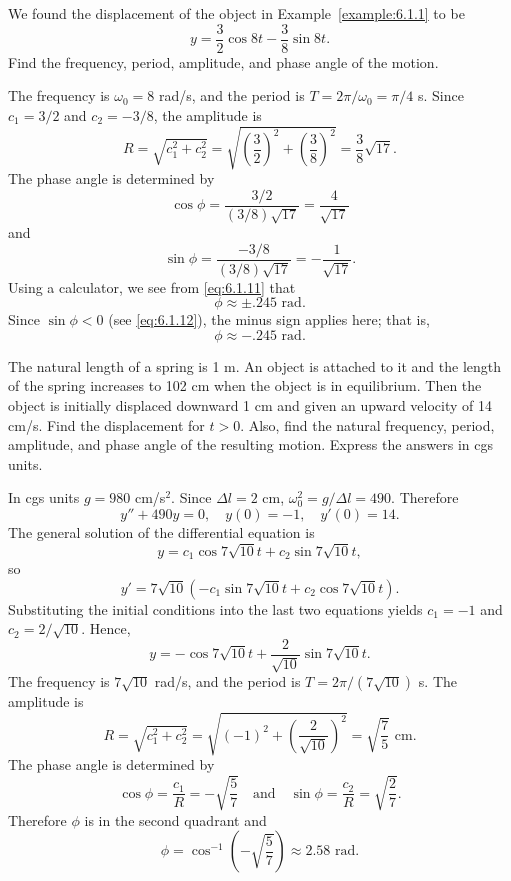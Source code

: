 \documentclass{ximera}
\begin{document}
\begin{example}\label{example:6.1.2}
We found the displacement of the object
 in Example~\ref{example:6.1.1} to be
$$
y=\frac{3}{2}\cos8t-\frac{3}{8}\sin8t.
$$
Find the frequency, period, amplitude, and phase angle of the motion.
 
\begin{explanation}
The frequency is $\omega_0=8$ rad/s, and the period is
$T=2\pi/\omega_0=\pi/4$ s. Since $c_1=3/2$ and $c_2=-3/8$,
the amplitude is
$$
R=\sqrt{c^2_1+c^2_2}=\sqrt{\left(\frac{3}{2}\right)^2+\left(\frac{3}{8}\right)^2}
=\frac{3}{8}\sqrt{17}.
$$
The phase angle is determined by
\begin{equation}\label{eq:6.1.11}
\cos\phi=\frac{3/2}{(3/8)\sqrt{17}}=\frac{4}{\sqrt{17}}
\end{equation}
and
\begin{equation}\label{eq:6.1.12}
\sin\phi=\frac{-3/8}{(3/8)\sqrt{17}}=-\frac{1}{\sqrt{17}}.
\end{equation}
 Using a calculator, we see from \eqref{eq:6.1.11} that
$$
\phi\approx\pm.245\mbox{ rad}.
$$
Since $\sin\phi<0$ (see \eqref{eq:6.1.12}), the minus sign applies here;
that is,
$$
\phi\approx-.245\mbox{ rad}.
$$
\end{explanation}
\end{example}
 
 
\begin{example}\label{example:6.1.3}
The natural length of a spring is 1 m. An object is attached to it and
the length of the spring increases to 102 cm when the object is in
equilibrium. Then the object is initially displaced downward 1 cm and
given an upward velocity of 14 cm/s. Find the displacement for
$t>0$. Also, find the natural frequency, period, amplitude, and phase
angle of the resulting motion. Express the answers in cgs units.
 
\begin{explanation}
In cgs units $g=980$ cm/s$^2$. Since $\Delta l=2$ cm,
$\omega_0^2=g/\Delta l=490$.
Therefore
$$
y''+490y=0, \quad  y(0)=-1,\quad y'(0)=14.
$$
 The general solution of the differential equation is
$$
y=c_1\cos7\sqrt{10}t+c_2\sin7\sqrt{10}t,
$$
so
$$
y'=7\sqrt{10}\left(-c_1\sin7\sqrt{10}t+c_2\cos7\sqrt{10}t\right).
$$
Substituting the initial conditions into the last two equations yields
$c_1=-1$ and $c_2=2/\sqrt{10}$. Hence,
$$
y=-\cos7\sqrt{10}t+\frac{2}{\sqrt{10}}\sin7\sqrt{10}t.
$$
The frequency is $7\sqrt{10}$ rad/s, and  the period
is $T=2\pi/(7\sqrt{10})$  s.
The amplitude  is
$$
R=\sqrt{c_1^2+c_2^2}=\sqrt{(-1)^2+\left(\frac{2}{\sqrt{10}}\right)^2}=
\sqrt{\frac{7}{5}}\mbox{ cm}.
$$
The  phase angle  is determined by
$$
\cos\phi=\frac{c_1}{R}=-\sqrt{\frac{5}{7}}\quad\mbox{and}\quad\sin\phi=
\frac{c_2}{R}=\sqrt{\frac{2}{7}}.
$$
Therefore $\phi$ is in the second quadrant and
$$
\phi=\cos^{-1}\left(-\sqrt{\frac{5}{7}}\right)\approx2.58\mbox{ rad}.
$$
\end{explanation}
\end{example}
 
\end{document}

